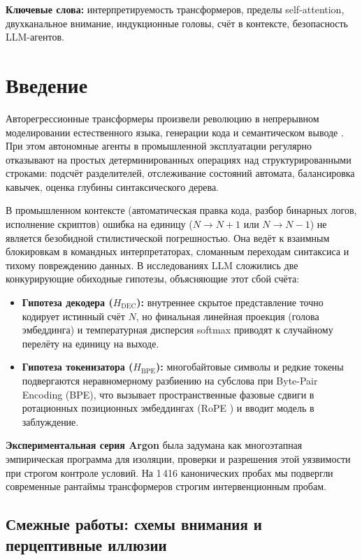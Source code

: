 \documentclass[11pt,a4paper]{article}
\begin{document}
\vspace{1em}
\noindent\textbf{Ключевые слова:} интерпретируемость трансформеров, пределы self-attention, двухканальное внимание, индукционные головы, счёт в контексте, безопасность LLM-агентов.

\newpage

\section{Введение}

Авторегрессионные трансформеры произвели революцию в непрерывном моделировании естественного языка, генерации кода и семантическом выводе \cite{vaswani2017attention}. При этом автономные агенты в промышленной эксплуатации регулярно отказывают на простых детерминированных операциях над структурированными строками: подсчёт разделителей, отслеживание состояний автомата, балансировка кавычек, оценка глубины синтаксического дерева.

В промышленном контексте (автоматическая правка кода, разбор бинарных логов, исполнение скриптов) ошибка на единицу ($N \to N+1$ или $N \to N-1$) не является безобидной стилистической погрешностью. Она ведёт к взаимным блокировкам в командных интерпретаторах, сломанным переходам синтаксиса и тихому повреждению данных. В исследованиях LLM сложились две конкурирующие обиходные гипотезы, объясняющие этот сбой счёта:
\begin{itemize}
    \item \textbf{Гипотеза декодера ($H_{\text{DEC}}$):} внутреннее скрытое представление точно кодирует истинный счёт $N$, но финальная линейная проекция (голова эмбеддинга) и температурная дисперсия softmax приводят к случайному перелёту на единицу на выходе.
    \item \textbf{Гипотеза токенизатора ($H_{\text{BPE}}$):} многобайтовые символы и редкие токены подвергаются неравномерному разбиению на субслова при Byte-Pair Encoding (BPE), что вызывает пространственные фазовые сдвиги в ротационных позиционных эмбеддингах (RoPE \cite{su2024roformer}) и вводит модель в заблуждение.
\end{itemize}

\textbf{Экспериментальная серия Argon} была задумана как многоэтапная эмпирическая программа для изоляции, проверки и разрешения этой уязвимости при строгом контроле условий. На 1\,416 канонических пробах мы подвергли современные рантаймы трансформеров строгим интервенционным пробам.

\subsection{Смежные работы: схемы внимания и перцептивные иллюзии}
\end{document}
